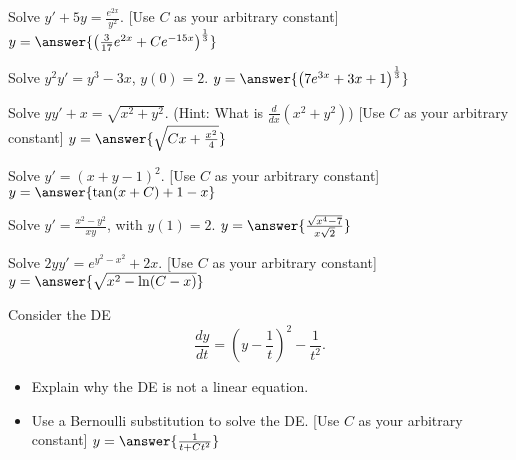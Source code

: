 \documentclass{ximera}
\begin{document}
\begin{exercise}
    Solve $y' + 5y = \frac{e^{2x}}{y^2}$. [Use $C$ as your arbitrary constant] $y = \answer{\left( \frac{3}{17}e^{2x} + Ce^{-15x} \right)^{\frac{1}{3}}}$
\end{exercise}

\begin{exercise}%
    Solve $y^2y' = y^3-3x$, $y(0)=2$. $y = \answer{\bigl(7 e^{3x} + 3x + 1 \bigr)^{\frac{1}{3}}}$
\end{exercise}

\begin{exercise}
    Solve $yy' + x = \sqrt{x^2 + y^2}$. (Hint: What is $\frac{d}{dx}(x^2 + y^2)$) [Use $C$ as your arbitrary constant] $y = \answer{\sqrt{Cx + \frac{x^2}{4}}}$
\end{exercise}

\begin{exercise}
    Solve $y' = {(x+y-1)}^2$. [Use $C$ as your arbitrary constant] $y = \answer{\tan(x+C) + 1 - x}$
\end{exercise}

\begin{exercise}
    Solve $y' = \frac{x^2-y^2}{x y}$, with $y(1) = 2$. $y = \answer{\frac{\sqrt{x^4 - 7}}{x\sqrt{2}}}$
\end{exercise}

\begin{exercise}
    Solve $2yy' = e^{y^2-x^2} + 2x$. [Use $C$ as your arbitrary constant] $y = \answer{\sqrt{x^2-\ln(C-x)}}$
\end{exercise}

\begin{exercise}
    Consider the  DE 
    \begin{equation}
        \frac{dy}{dt}=\left( y -\frac{1}{t} \right)^2 - \frac{1}{t^2}. \label{eq:subsEx1}
    \end{equation} %
    \begin{itemize}
        \item Explain why the DE is not a linear equation.
        \item Use a Bernoulli substitution to solve the DE. [Use $C$ as your arbitrary constant] $y = \answer{\frac{1}{t + Ct^2}}$ 
    \end{itemize}
\end{exercise}

\end{document}

